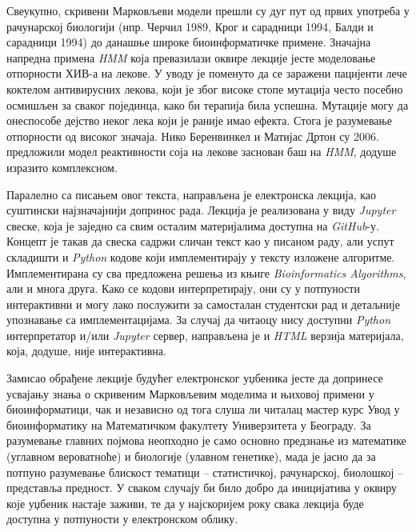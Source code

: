 \documentclass[12pt,oneside]{memoir}
\begin{document}
\begin{CJK}{UTF8}{ipxm}
Свеукупно, скривени Марковљеви модели прешли су дуг пут од првих употреба у рачунарској биологији (нпр. Черчил 1989\cite{churchill1989}, Крог и сарадници 1994\cite{krogh1994}, Балди и сарадници 1994\cite{baldi1994}) до данашње широке биоинформатичке примене. Значајна напредна примена \textit{HMM} која превазилази оквире лекције јесте моделовање отпорности ХИВ-а на лекове. У уводу је поменуто да се заражени пацијенти лече коктелом антивирусних лекова, који је због високе стопе мутација често посебно осмишљен за сваког појединца, како би терапија била успешна. Мутације могу да онеспособе дејство неког лека који је раније имао ефекта. Стога је разумевање отпорности од високог значаја. Нико Беренвинкел и Матијас Дртон су 2006. предложили модел реактивности соја на лекове заснован баш на \textit{HMM}, додуше изразито комплексном\cite{beerenwinkel2007}.

Паралелно са писањем овог текста, направљена је електронска лекција, као суштински најзначајнији допринос рада. Лекција је реализована у виду \textit{Jupyter} свеске, која је заједно са свим осталим материјалима доступна на \textit{GitHub}-у\cite{vasovich2021}. Концепт је такав да свеска садржи сличан текст као у писаном раду, али успут складишти и \textit{Python} кодове који имплементирају у тексту изложене алгоритме. Имплементирана су сва предложена решења из књиге \textit{Bioinformatics Algorithms}, али и многа друга. Како се кодови интерпретирају, они су у потпуности интерактивни и могу лако послужити за самосталан студентски рад и детаљније упознавање са имплементацијама. За случај да читаоцу нису доступни \textit{Python} интерпретатор и/или \textit{Jupyter} сервер, направљена је и \textit{HTML} верзија материјала, која, додуше, није интерактивна.

Замисао обрађене лекције будућег електронског уџбеника јесте да допринесе усвајању знања о скривеним Марковљевим моделима и њиховој примени у биоинформатици, чак и независно од тога слуша ли читалац мастер курс Увод у биоинформатику на Математичком факултету Универзитета у Београду. За разумевање главних појмова неопходно је само основно предзнање из математике (углавном вероватноће) и биологије (улавном генетике), мада је јасно да за потпуно разумевање блискост тематици -- статистичкој, рачунарској, биолошкој -- представља предност. У сваком случају би било добро да иницијатива у оквиру које уџбеник настаје заживи, те да у најскоријем року свака лекција буде доступна у потпуности у електронском облику.

\literatura

\end{CJK}
\end{document}
